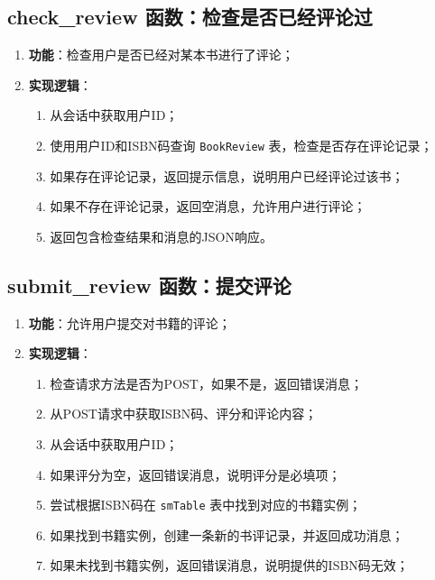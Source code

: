 \documentclass{ctexart}
\begin{document}
\subsection{check\_review 函数：检查是否已经评论过}
\begin{enumerate}
    \item \textbf{功能}：检查用户是否已经对某本书进行了评论；
    \item \textbf{实现逻辑}：
    \begin{enumerate}
        \item 从会话中获取用户ID；
        \item 使用用户ID和ISBN码查询 \texttt{BookReview} 表，检查是否存在评论记录；
        \item 如果存在评论记录，返回提示信息，说明用户已经评论过该书；
        \item 如果不存在评论记录，返回空消息，允许用户进行评论；
        \item 返回包含检查结果和消息的JSON响应。
    \end{enumerate}
\end{enumerate}

\subsection{submit\_review 函数：提交评论}
\begin{enumerate}
    \item \textbf{功能}：允许用户提交对书籍的评论；
    \item \textbf{实现逻辑}：
    \begin{enumerate}
        \item 检查请求方法是否为POST，如果不是，返回错误消息；
        \item 从POST请求中获取ISBN码、评分和评论内容；
        \item 从会话中获取用户ID；
        \item 如果评分为空，返回错误消息，说明评分是必填项；
        \item 尝试根据ISBN码在 \texttt{smTable} 表中找到对应的书籍实例；
        \item 如果找到书籍实例，创建一条新的书评记录，并返回成功消息；
        \item 如果未找到书籍实例，返回错误消息，说明提供的ISBN码无效；
    \end{enumerate}
\end{enumerate}
\end{document}
